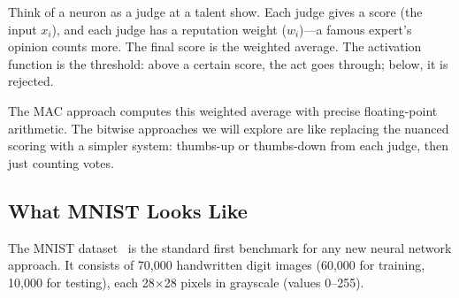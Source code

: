 \begin{analogy}
Think of a neuron as a judge at a talent show. Each judge gives a
score (the input $x_i$), and each judge has a reputation weight
($w_i$)---a famous expert's opinion counts more. The final score is
the weighted average. The activation function is the threshold: above
a certain score, the act goes through; below, it is rejected.

The MAC approach computes this weighted average with precise
floating-point arithmetic. The bitwise approaches we will explore
are like replacing the nuanced scoring with a simpler system:
thumbs-up or thumbs-down from each judge, then just counting votes.
\end{analogy}

\subsection{What MNIST Looks Like}
\label{sec:mnist}

The MNIST dataset~\cite{lecun1998mnist} is the standard first benchmark
for any new neural network approach. It consists of 70,000 handwritten
digit images (60,000 for training, 10,000 for testing), each
28$\times$28 pixels in grayscale (values 0--255).

